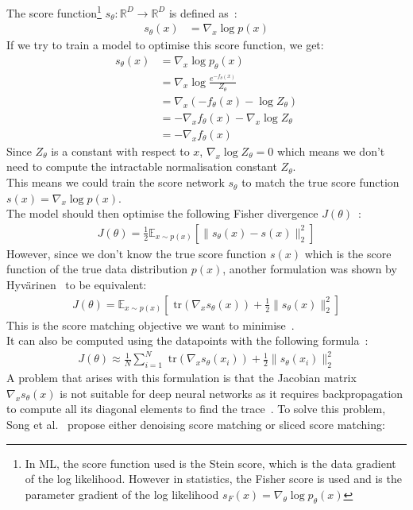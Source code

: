 \documentclass[twoside]{article}
\numberwithin{equation}{section}
\numberwithin{figure}{section}
\begin{document}
The score function\footnote{In ML, the score function used is the Stein score, which is the data gradient of the log likelihood. However in statistics, the Fisher score is used and is the parameter gradient of the log likelihood $s_F (x) = \nabla_\theta \log p_\theta (x)$ } $s_\theta : \mathbb{R}^D \rightarrow \mathbb{R}^D$ is defined as~\cite{song2020generative}: 
\begin{align}
  s_\theta (x) &= \nabla_x \log p(x)
\end{align}
If we try to train a model to optimise this score function, we get:
\begin{align}
  s_\theta (x) &= \nabla_x \log p_\theta(x) \\
  &= \nabla_x \log \frac{e^{-f_\theta (x)}}{Z_\theta} \\
  &= \nabla_x \left( -f_\theta (x) - \log Z_\theta \right) \\
  &= - \nabla_x f_\theta (x) - \nabla_x \log Z_\theta \\
  &= - \nabla_x f_\theta (x)
\end{align}
Since $Z_\theta$ is a constant with respect to $x$, $\nabla_x \log Z_\theta = 0$ which means we don't need to compute the intractable normalisation constant $Z_\theta$. \\
This means we could train the score network $s_\theta$ to match the true score function $s(x) = \nabla_x \log p(x)$. \\
The model should then optimise the following Fisher divergence $J(\theta)$~\cite{hyvarinen2005, luo2022understanding}:
\begin{align}
  J(\theta) = \frac{1}{2} \mathbb{E}_{x \sim p(x)} \left[ \| s_\theta (x) - s(x) \|_2^2 \right]
\end{align}
However, since we don't know the true score function $s(x)$ which is the score function of the true data distribution $p(x)$, another formulation was shown by Hyvärinen~\cite{hyvarinen2005} to be equivalent: 
\begin{align}
  J(\theta) = \mathbb{E}_{x \sim p(x)} \left[ \text{ tr}(\nabla_x s_\theta (x)) + \frac{1}{2} \| s_\theta (x) \|_2^2 \right]
\end{align}
This is the score matching objective we want to minimise~\cite{hyvarinen2005}. \\
It can also be computed using the datapoints with the following formula~\cite{hyvarinen2005}:
\begin{align}
  J(\theta) \approx \frac{1}{N} \sum_{i=1}^N \text{ tr}(\nabla_x s_\theta (x_i)) + \frac{1}{2} \| s_\theta (x_i) \|_2^2
\end{align}
A problem that arises with this formulation is that the Jacobian matrix $\nabla_x s_\theta (x)$ is not suitable for deep neural networks as it requires backpropagation to compute all its diagonal elements to find the trace~\cite{song2020generative, song2019sliced}. To solve this problem, Song et al.~\cite{song2020generative} propose either denoising score matching or sliced score matching:
\end{document}
